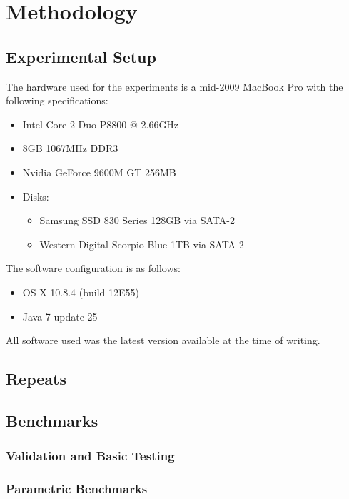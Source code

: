 \chapter{Methodology} \label{sec:methodology}
\section{Experimental Setup} \label{sec:methodology/setup}
The hardware used for the experiments is a mid-2009 MacBook Pro with the following specifications:
	
\begin{itemize}
	\item Intel Core 2 Duo P8800 @ 2.66GHz
	\item 8GB 1067MHz DDR3
	\item Nvidia GeForce 9600M GT 256MB
	\item Disks:
	\begin{itemize}
		\item Samsung SSD 830 Series 128GB via SATA-2
		\item Western Digital Scorpio Blue 1TB via SATA-2
	\end{itemize}
\end{itemize}

The software configuration is as follows:
\begin{itemize}
	\item OS X 10.8.4 (build 12E55)
	\item Java 7 update 25
\end{itemize}

All software used was the latest version available at the time of writing.

\section{Repeats} \label{sec:methodology/repeats}

\section{Benchmarks} \label{sec:methodology/benchmarks}
	\subsection{Validation and Basic Testing} \label{sec:methodology/benchmarks/simple}
	
	\subsection{Parametric Benchmarks} \label{sec:methodology/benchmarks/parametric}
	
